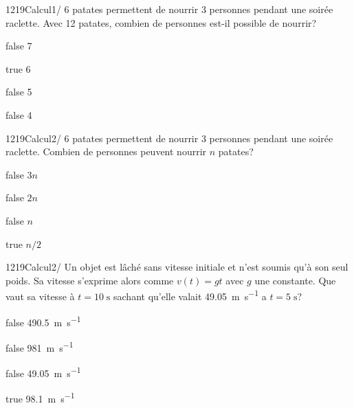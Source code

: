             \begin{question}{1219}{Calcul}{1}{/}
            	6 patates permettent de nourrir 3 personnes pendant une soirée raclette. Avec 12 patates, combien de personnes est-il possible de nourrir?
            \end{question}
            \begin{reponses}
            	\item[false] 7
            	\item[true] 6
                \item[false] 5
                \item[false] 4
            \end{reponses}
            \begin{question}{1219}{Calcul}{2}{/}
            	6 patates permettent de nourrir 3 personnes pendant une soirée raclette. Combien de personnes peuvent nourrir $n$ patates?
            \end{question}
            \begin{reponses}
            	\item[false] $3n$
            	\item[false] $2n$
                \item[false] $n$
                \item[true] $n/2$
            \end{reponses}
            \begin{question}{1219}{Calcul}{2}{/}
            	Un objet est lâché sans vitesse initiale et n'est soumis qu'à son seul poids. Sa vitesse s'exprime alors comme $v(t)=gt$ avec $g$ une constante. Que vaut sa vitesse à $t=10\;\si{\second}$ sachant qu'elle valait \SI{49,05}{\meter\per\second} a $t=5\;\si{\second}$?
            \end{question}
            \begin{reponses}
            	\item[false] \SI{490,5}{\meter\per\second}
            	\item[false] \SI{981}{\meter\per\second}
                \item[false] \SI{49,05}{\meter\per\second}
                \item[true] \SI{98,1}{\meter\per\second}
            \end{reponses}
